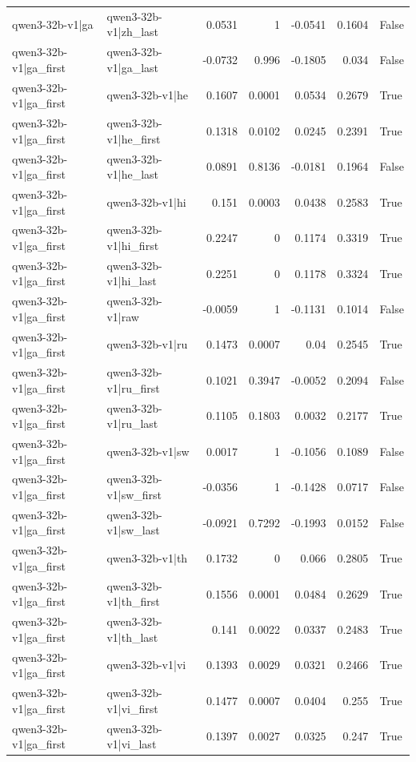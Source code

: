 \begin{table}
\begin{tabular}{l l r r r r l}
qwen3-32b-v1|ga & qwen3-32b-v1|zh_last & 0.0531 & 1 & -0.0541 & 0.1604 & False \\
qwen3-32b-v1|ga_first & qwen3-32b-v1|ga_last & -0.0732 & 0.996 & -0.1805 & 0.034 & False \\
qwen3-32b-v1|ga_first & qwen3-32b-v1|he & 0.1607 & 0.0001 & 0.0534 & 0.2679 & True \\
qwen3-32b-v1|ga_first & qwen3-32b-v1|he_first & 0.1318 & 0.0102 & 0.0245 & 0.2391 & True \\
qwen3-32b-v1|ga_first & qwen3-32b-v1|he_last & 0.0891 & 0.8136 & -0.0181 & 0.1964 & False \\
qwen3-32b-v1|ga_first & qwen3-32b-v1|hi & 0.151 & 0.0003 & 0.0438 & 0.2583 & True \\
qwen3-32b-v1|ga_first & qwen3-32b-v1|hi_first & 0.2247 & 0 & 0.1174 & 0.3319 & True \\
qwen3-32b-v1|ga_first & qwen3-32b-v1|hi_last & 0.2251 & 0 & 0.1178 & 0.3324 & True \\
qwen3-32b-v1|ga_first & qwen3-32b-v1|raw & -0.0059 & 1 & -0.1131 & 0.1014 & False \\
qwen3-32b-v1|ga_first & qwen3-32b-v1|ru & 0.1473 & 0.0007 & 0.04 & 0.2545 & True \\
qwen3-32b-v1|ga_first & qwen3-32b-v1|ru_first & 0.1021 & 0.3947 & -0.0052 & 0.2094 & False \\
qwen3-32b-v1|ga_first & qwen3-32b-v1|ru_last & 0.1105 & 0.1803 & 0.0032 & 0.2177 & True \\
qwen3-32b-v1|ga_first & qwen3-32b-v1|sw & 0.0017 & 1 & -0.1056 & 0.1089 & False \\
qwen3-32b-v1|ga_first & qwen3-32b-v1|sw_first & -0.0356 & 1 & -0.1428 & 0.0717 & False \\
qwen3-32b-v1|ga_first & qwen3-32b-v1|sw_last & -0.0921 & 0.7292 & -0.1993 & 0.0152 & False \\
qwen3-32b-v1|ga_first & qwen3-32b-v1|th & 0.1732 & 0 & 0.066 & 0.2805 & True \\
qwen3-32b-v1|ga_first & qwen3-32b-v1|th_first & 0.1556 & 0.0001 & 0.0484 & 0.2629 & True \\
qwen3-32b-v1|ga_first & qwen3-32b-v1|th_last & 0.141 & 0.0022 & 0.0337 & 0.2483 & True \\
qwen3-32b-v1|ga_first & qwen3-32b-v1|vi & 0.1393 & 0.0029 & 0.0321 & 0.2466 & True \\
qwen3-32b-v1|ga_first & qwen3-32b-v1|vi_first & 0.1477 & 0.0007 & 0.0404 & 0.255 & True \\
qwen3-32b-v1|ga_first & qwen3-32b-v1|vi_last & 0.1397 & 0.0027 & 0.0325 & 0.247 & True \\

\end{tabular}
\end{table}
